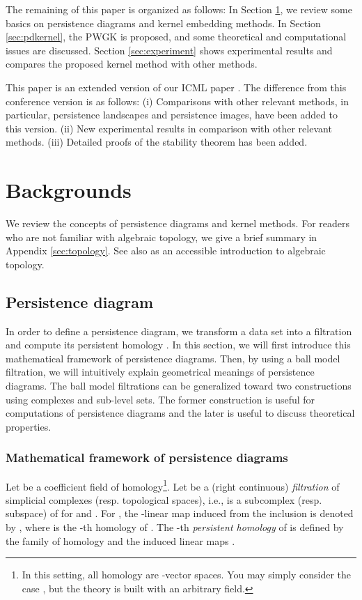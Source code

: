 \documentclass{article}
\begin{document}
The remaining of this paper is organized as follows:
In Section \ref{sec:background}, we review some basics on persistence diagrams and kernel embedding methods.
In Section \ref{sec:pdkernel},  the PWGK is proposed, and some theoretical and computational issues are discussed.
Section \ref{sec:experiment} shows experimental results and compares the proposed kernel method with other methods.

This paper is an extended version of our ICML paper \cite{KFH16}.
The difference from this conference version is as follows:
(i) Comparisons with other relevant methods, in particular, persistence landscapes and persistence images, have been added to this version.
(ii) New experimental results in comparison with other relevant methods.
(iii) Detailed proofs of the stability theorem has been added.

\section{Backgrounds}
\label{sec:background}

We review the concepts of persistence diagrams and kernel methods.  For readers who are not familiar with algebraic topology, we give a brief summary in Appendix \ref{sec:topology}.  See also \cite{Ha02} as an accessible introduction to algebraic topology.

\subsection{Persistence diagram}
\label{subsec:persistence_diagram}

In order to define a persistence diagram, we transform a data set  into a filtration  and compute its persistent homology .
In this section, we will first introduce this mathematical framework of persistence diagrams. Then, by using a ball model filtration, we will intuitively explain geometrical meanings of persistence diagrams.
The ball model filtrations can be generalized toward two constructions using  complexes and sub-level sets.
The former construction is useful for computations of persistence diagrams and the later is useful to discuss theoretical properties.

\subsubsection{Mathematical framework of persistence diagrams}

Let  be a coefficient field of homology\footnote{In this setting, all homology are -vector spaces.
You may simply consider the case , but the theory is built with an arbitrary field.}.
Let  be a (right continuous) {\em filtration} of simplicial complexes (resp. topological spaces), i.e.,  is a subcomplex (resp. subspace) of  for  and .
For , the -linear map induced from the inclusion  is denoted by , where  is the -th homology of .
The -th {\em persistent homology}  of  is defined by the family of homology  and the induced linear maps . 
\end{document}

